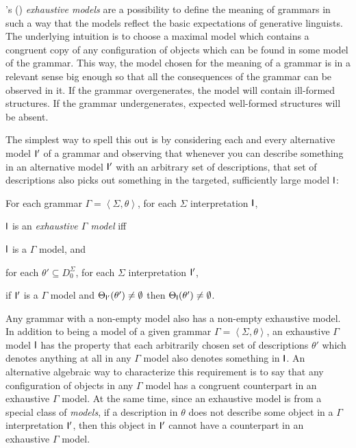 \documentclass[output=paper,biblatex,babelshorthands,newtxmath,draftmode,colorlinks,citecolor=brown]{langscibook}
\begin{document}
{\citeauthor{King99a-u}'s (\citeyear{King99a-u}) \emph{exhaustive models} are a possibility to
define the meaning of grammars in such a way that the models reflect the
basic expectations of generative linguists. The underlying intuition
is to choose a maximal model which contains a congruent copy of any
configuration of objects which can be found in some model of the grammar.
This way, the model chosen for the meaning of a grammar is in a
relevant sense big enough so that all
the consequences of the grammar can be observed in it. If the grammar
overgenerates, the model will contain ill-formed structures. If the grammar
undergenerates, expected well-formed structures will be absent.

The simplest way to spell this out is by considering each and every
alternative model $\mathsf{I}'$ of a grammar and observing that whenever
you can describe something in an alternative model $\mathsf{I}'$ with an
arbitrary set of descriptions, that set of descriptions also picks out
something in the targeted, sufficiently large model $\mathsf{I}$:

\begin{mydef}\label{def-exhaustive-models}
For each grammar $\Gamma = \left< \Sigma, \theta \right>$,
for each $\Sigma$ interpretation $\mathsf{I}$,

$\mathsf{I}$ is an \emph{exhaustive $\Gamma$ model} iff

$\mathsf{I}$ is a $\Gamma$ model, and

for each \(\theta' \subseteq D_0^{\Sigma}\),
for each $\Sigma$ interpretation $\mathsf{I}'$,

if $\mathsf{I}'$ is a $\Gamma$ model and \(\Theta_{\mathsf{I}'}(\theta') \not= \emptyset\)
then \(\Theta_{\mathsf{I}}(\theta') \not= \emptyset\).
\end{mydef}

Any grammar with a non-empty model also has a non-empty exhaustive
mod\-el.
In addition to being a model of a given grammar $\Gamma = \left<
\Sigma, \theta \right>$, an exhaustive $\Gamma$ model $\mathsf{I}$ has the
property that each arbitrarily chosen set of descriptions $\theta'$
which denotes anything at all in any $\Gamma$ model also denotes
something in $\mathsf{I}$. An alternative algebraic way to characterize
this requirement is to say that any configuration of objects in any
$\Gamma$ model has a congruent counterpart in an exhaustive $\Gamma$
model. At the same time, since an exhaustive model is from a special class
of \emph{models}, if a description in $\theta$ does not describe some object in
a $\Gamma$ interpretation $\mathsf{I}'$, then this object in $\mathsf{I}'$ cannot
have a counterpart in an exhaustive $\Gamma$ model.

}
\end{document}
